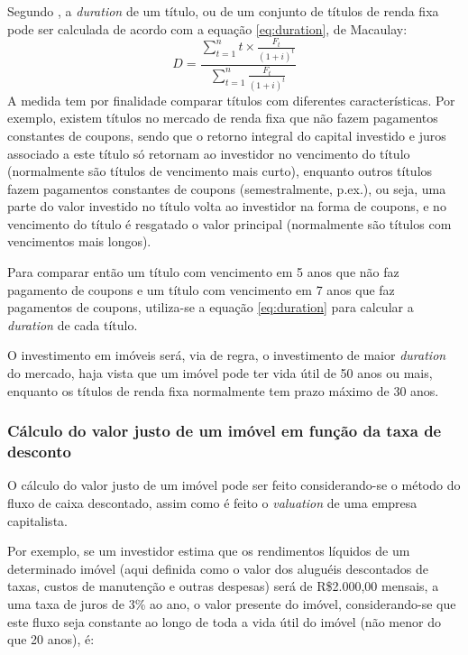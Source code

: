 \documentclass[
	12pt,				%
	oneside,			%
	a4paper,			%
	chapter=TITLE,		%
	section=TITLE,		%
	english,			%
	brazil				%
	]{abntex2}
\begin{document}
Segundo \textcite{marins1}, a \emph{duration} de um título, ou de um conjunto de títulos de
renda fixa pode ser calculada de acordo com a equação \eqref{eq:duration},
de Macaulay:
\begin{equation}
D = \frac{\sum\limits_{t = 1}^{n} t \times \frac{F_t}{(1+i)^t}}{\sum\limits_{t = 1}^{n} \frac{F_t}{(1+i)^t}}
\label{eq:duration}
\end{equation}
A medida tem por finalidade comparar títulos com diferentes características. Por
exemplo, existem títulos no mercado de renda fixa que não fazem pagamentos
constantes de coupons, sendo que o retorno integral do capital investido e juros
associado a este título só retornam ao investidor no vencimento do título
(normalmente são títulos de vencimento mais curto), enquanto outros títulos
fazem pagamentos constantes de coupons (semestralmente, p.ex.), ou seja,
uma parte do valor investido no título volta ao investidor na forma de coupons,
e no vencimento do título é resgatado o valor principal (normalmente são títulos
com vencimentos mais longos).

Para comparar então um título com vencimento em 5 anos que não faz pagamento de
coupons e um título com vencimento em 7 anos que faz pagamentos de coupons,
utiliza-se a equação \eqref{eq:duration} para calcular a \emph{duration} de cada
título.

O investimento em imóveis será, via de regra, o investimento de maior \emph{duration}
do mercado, haja vista que um imóvel pode ter vida útil de 50 anos ou mais,
enquanto os títulos de renda fixa normalmente tem prazo máximo de 30 anos.

\hypertarget{cuxe1lculo-do-valor-justo-de-um-imuxf3vel-em-funuxe7uxe3o-da-taxa-de-desconto}{%
\subsubsection{Cálculo do valor justo de um imóvel em função da taxa de desconto}\label{cuxe1lculo-do-valor-justo-de-um-imuxf3vel-em-funuxe7uxe3o-da-taxa-de-desconto}}

O cálculo do valor justo de um imóvel pode ser feito considerando-se o método
do fluxo de caixa descontado, assim como é feito o \emph{valuation} de uma empresa
capitalista.

Por exemplo, se um investidor estima que os rendimentos líquidos de um
determinado imóvel (aqui definida como o valor dos aluguéis descontados de
taxas, custos de manutenção e outras despesas) será de R\$2.000,00 mensais, a uma
taxa de juros de 3\% ao ano, o valor presente do imóvel, considerando-se que este
fluxo seja constante ao longo de toda a vida útil do imóvel (não menor do que 20
anos), é:
\end{document}
